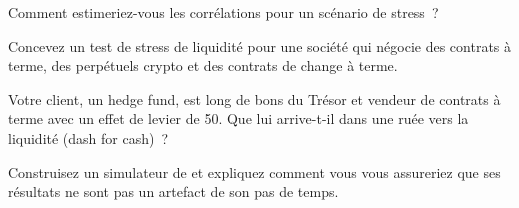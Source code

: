 \begin{interviewq}\label{iq:m3:when-markets-break-together:3}
Comment estimeriez-vous les corrélations pour un scénario de stress~?
\end{interviewq}

\begin{interviewq}\label{iq:m3:when-markets-break-together:4}
Concevez un test de stress de liquidité pour une société qui négocie des contrats à terme, des perpétuels crypto et des contrats de change à terme.
\end{interviewq}

\begin{interviewq}\label{iq:m3:when-markets-break-together:5}
Votre client, un hedge fund, est long de bons du Trésor et vendeur de contrats à terme avec un effet de levier de 50. Que lui arrive-t-il dans une ruée vers la liquidité (dash for cash)~?
\end{interviewq}

\begin{interviewq}\label{iq:m3:when-markets-break-together:6}
Construisez un simulateur de  et expliquez comment vous vous assureriez que ses résultats ne sont pas un artefact de son pas de temps.
\end{interviewq}
